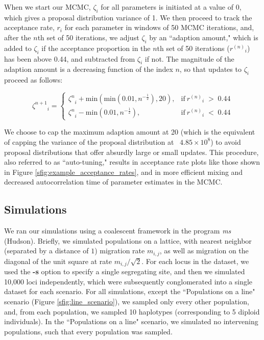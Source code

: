 \documentclass[12pt]{article}
\begin{document}
When we start our MCMC, $\zeta_i$ for all parameters is initiated at a value of 0, which gives a proposal distribution variance of 1.  We then proceed to track the acceptance rate, $r_i$ for each parameter in windows of 50 MCMC iterations, and, after the $n$th set of 50 iterations, we adjust $\zeta_i$ by an ``adaption amount," which is added to $\zeta_i$ if the acceptance proportion in the $n$th set of 50 iterations (${r^{(n)}}_i$) has been above 0.44, and subtracted from $\zeta_i$ if not.  The magnitude of the adaption amount is a decreasing function of the index $n$, so that updates to $\zeta_i$ proceed as follows:

\begin{equation}
{\zeta^{n+1}}_i =
\begin{cases}
{\zeta^{n}}_i + \text{min}(\text{min}(0.01,n^{-\frac{1}{2}}),20), & \text{if} \: {r^{(n)}}_i \; > \; 0.44 \\
{\zeta^{n}}_i - \text{min}(0.01,n^{-\frac{1}{2}}), & \text{if} \: {r^{(n)}}_i \; < \; 0.44
\end{cases}
\label{eq:adpative_mcmc}
\end{equation}

We choose to cap the maximum adaption amount at 20 (which is the equivalent of capping the variance of the proposal distribution at ~$4.85 \times 10^8$) to avoid proposal distributions that offer absurdly large or small updates.  This procedure, also referred to as ``auto-tuning," results in acceptance rate plots like those shown in Figure \ref{sfig:example_acceptance_rates}, and in more efficient mixing and decreased autocorrelation time of parameter estimates in the MCMC.

\subsection*{Simulations}
We ran our simulations using a coalescent framework in the program \textit{ms} (Hudson).  Briefly, we simulated populations on a lattice, with nearest neighbor (separated by a distance of $1$) migration rate $m_{i,j}$, as well as migration on the diagonal of the unit square at rate $m_{i,j}/\sqrt{2}$.  For each locus in the dataset, we used the \textbf{-s} option to specify a single segregating site, and then we simulated 10,000 loci independently, which were subsequently conglomerated into a single dataset for each scenario.  For all simulations, except the ``Populations on a line" scenario (Figure  \ref{sfig:line_scenario}), we sampled only every other population, and, from each population, we sampled 10 haplotypes (corresponding to 5 diploid individuals).  In the ``Populations on a line" scenario, we simulated no intervening populations, such that every population was sampled.
\end{document}
